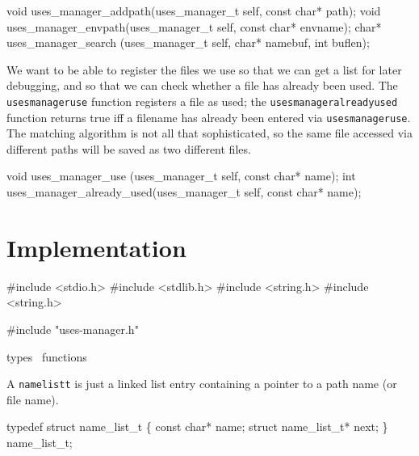 \nwenddocs{}\plusendmoddef
void  uses_manager_addpath(uses_manager_t self, const char* path);
void  uses_manager_envpath(uses_manager_t self, const char* envname);
char* uses_manager_search (uses_manager_t self, char* namebuf, int buflen);

\nwendcode{}\nwdocspar

We want to be able to register the files we use so that
we can get a list for later debugging, and so that we can
check whether a file has already been used.  The {\tt{}uses{}manager{}use}
function registers a file as used; the {\tt{}uses{}manager{}already{}used}
function returns true iff a filename has already been entered via
{\tt{}uses{}manager{}use}.  The matching algorithm is not all that sophisticated,
so the same file accessed via different paths will be saved as two different
files.

\nwenddocs{}\plusendmoddef
void  uses_manager_use         (uses_manager_t self, const char* name);
int   uses_manager_already_used(uses_manager_t self, const char* name);
\nwendcode{}\nwdocspar


\section{Implementation}

\nwenddocs{}\endmoddef
#include <stdio.h>
#include <stdlib.h>
#include <string.h>
#include <string.h>

#include "uses-manager.h"

\LA{}types~{\nwtagstyle{}}\RA{}
\LA{}functions~{\nwtagstyle{}}\RA{}
\nwendcode{}\nwdocspar

A {\tt{}name{}list{}t} is just a linked list entry containing a pointer
to a path name (or file name).

\nwenddocs{}\endmoddef
typedef struct name_list_t \{
    const char* name;
    struct name_list_t* next;
\} name_list_t;

